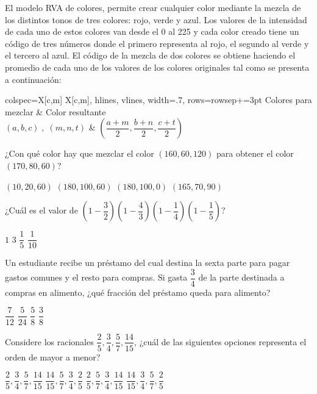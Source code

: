 \documentclass[revolver]{srs}
\begin{document}
\begin{preguntas}[after-item-skip=2cm]
\pregunta El modelo RVA de colores, permite crear cualquier color mediante la mezcla de los distintos tonos de tres colores: rojo, verde y azul.
Los valores de la intensidad de cada uno de estos colores van desde el 0 al 225 y cada color creado tiene un código de tres números donde el
primero representa al rojo, el segundo al verde y el tercero al azul.
\newline
El código de la mezcla de dos colores se obtiene haciendo el promedio de cada uno de los valores de los colores originales tal como se presenta a continuación:
\begin{centrado}
\begin{tblr}{
  colspec={X[c,m] X[c,m]},
  hlines, vlines,
  width=.7\textwidth,
  rows={rowsep+=3pt}
}
Colores para mezclar & Color resultante \\
$\left(a, b, c\right)\;,\; \left(m, n, t\right)$ & $\left(\dfrac{a+m}{2}, \dfrac{b+n}{2}, \dfrac{c+t}{2}\right)$ \\
\end{tblr}
\end{centrado}
¿Con qué color hay que mezclar el color $\left(160, 60, 120\right)$ para obtener el color $\left(170, 80, 60\right)$?
\begin{vertical}
\alternativa $\left(10, 20, 60\right)$
\alternativa $\left(180, 100, 60\right)$
\alternativa $\left(180, 100, 0\right)$
\alternativa $\left(165, 70, 90\right)$
\end{vertical}

\pregunta ¿Cuál es el valor de $\left(1-\dfrac{3}{2}\right)\left(1-\dfrac{4}{3}\right)\left(1-\dfrac{1}{4}\right)\left(1-\dfrac{1}{5}\right)$?
\begin{vertical}
\alternativa $1$
\alternativa $3$
\alternativa $\dfrac{1}{5}$
\alternativa $\dfrac{1}{10}$
\end{vertical}

\pregunta Un estudiante recibe un préstamo del cual destina la sexta parte para pagar gastos comunes y el resto para compras.
Si gasta $\dfrac{3}{4}$ de la parte destinada a compras en alimento, ¿qué fracción del préstamo queda para alimento?
\begin{vertical}
\alternativa $\dfrac{7}{12}$
\alternativa $\dfrac{5}{24}$
\alternativa $\dfrac{5}{8}$
\alternativa $\dfrac{3}{8}$
\end{vertical}

\pregunta Considere los racionales $\dfrac{2}{5}, \dfrac{3}{4}, \dfrac{5}{7}, \dfrac{14}{15}$, ¿cuál de las siguientes
opciones representa el orden de mayor a menor?
\begin{vertical}
\alternativa $\dfrac{2}{5}, \dfrac{3}{4}, \dfrac{5}{7}, \dfrac{14}{15}$
\alternativa $\dfrac{14}{15}, \dfrac{5}{7}, \dfrac{3}{4}, \dfrac{2}{5}$
\alternativa $\dfrac{2}{5}, \dfrac{5}{7}, \dfrac{3}{4}, \dfrac{14}{15}$
\alternativa $\dfrac{14}{15}, \dfrac{3}{4}, \dfrac{5}{7}, \dfrac{2}{5}$
\end{vertical}


\end{preguntas}
\end{document}

